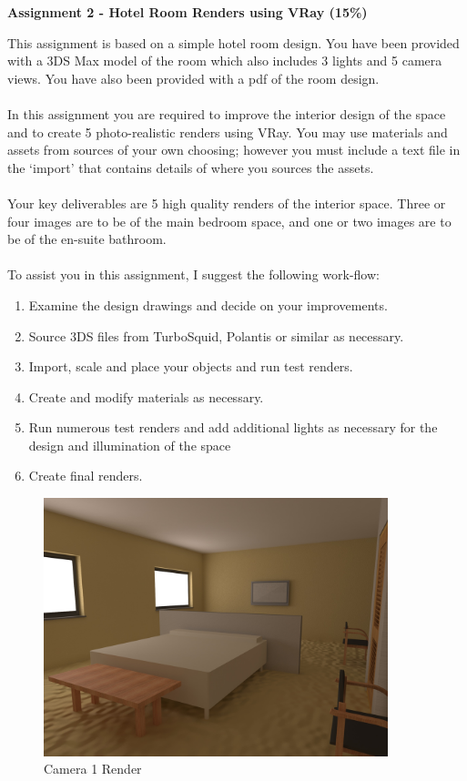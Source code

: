 

\begin{flushleft}
\Large\textbf{Assignment 2 - Hotel Room Renders using VRay (15\%)}\\
\end{flushleft}

This assignment is based on a simple hotel room design.  You have been provided with a 3DS Max model of the room which also includes 3 lights and 5 camera views.  You have also been provided with a pdf of the room design. \\
\\
In this assignment you are required to improve the interior design of the space and to create 5 photo-realistic renders using VRay. You may use materials and assets from sources of your own choosing; however you must include a text file in the `import' that contains details of where you sources the assets.\\
\\
Your key deliverables are 5 high quality renders of the interior space. Three or four images are to be of the main bedroom space, and one or two images are to be of the en-suite bathroom.\\
\\
To assist you in this assignment, I suggest the following work-flow:\\

\begin{enumerate}
	\item Examine the design drawings and decide on your improvements.
	\item Source 3DS files from TurboSquid, Polantis or similar as necessary.
	\item Import, scale and place your objects and run test renders.
	\item Create and modify materials as necessary.
	\item Run numerous test renders and add additional lights as necessary for the design and illumination of the space
	\item Create final renders.
\end{enumerate}



\begin{figure}[hb]
	\centering
		\includegraphics[width=10cm]{img/HotelRoomCamera1.jpg}
		\caption{Camera 1 Render}
	\label{fig:Cam1}
\end{figure}


